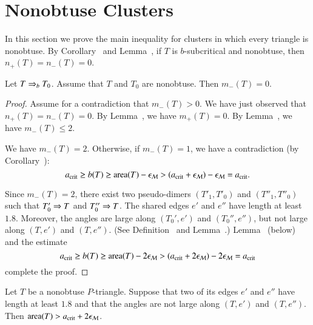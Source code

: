 \section{Nonobtuse Clusters}

In this section we prove the main inequality for clusters in which
every triangle is nonobtuse.  By Corollary~ and
Lemma~, if $T$ is $b$-subcritical and nonobtuse, then
$n_+(T)=n_-(T)=0$.

\begin{lemma} 
  Let $T\Rightarrow_{b} T_0$. Assume that $T$ and $T_0$ are nonobtuse.  Then
  $m_-(T)=0$.
\end{lemma}

\begin{proof}  
  Assume for a contradiction that $m_-(T)>0$.  We have just observed
  that $n_+(T)=n_-(T)=0$.  By Lemma~, we have
  $m_+(T)=0$.  By Lemma~, we have $m_-(T)\le 2$.


  We have $m_-(T)=2$.  Otherwise, if $m_-(T)=1$, we have a
  contradiction (by Corollary~):
\[
a_\text{crit} \ge b(T) \ge {\operatorname{area}}(T) - \epsilon_{\mathcal M} 
> (a_\text{crit} + \epsilon_{\mathcal M}) - \epsilon_{\mathcal M} = a_\text{crit}.
\]

Since $m_-(T)=2$, there exist two pseudo-dimers $(T'_1,T'_0)$ and
$(T''_1,T''_0)$ such that $T'_0\Rightarrow T$ and $T''_0\Rightarrow T$.  The shared
edges $e'$ and $e''$ have length at least $1.8$.  Moreover, the angles
are large along $(T_0',e')$ and $(T_0'',e'')$, but not large along
$(T,e')$ and $(T,e'')$.  (See Definition~ and
Lemma~.)  Lemma~ (below) and the
estimate
\[
a_\text{crit} \ge b(T) \ge {\operatorname{area}}(T) - 2\epsilon_{\mathcal M} 
> (a_\text{crit} + 2\epsilon_{\mathcal M}) - 2\epsilon_{\mathcal M} = a_\text{crit}
\]
complete the proof.
\end{proof}

\begin{lemma} 
  Let $T$ be a nonobtuse $P$-triangle.  Suppose that two of its edges
  $e'$ and $e''$ have length at least $1.8$ and that the angles are
  not large along $(T,e')$ and $(T,e'')$.  Then ${\operatorname{area}}(T) > a_\text{crit} +
  2\epsilon_{\mathcal M}$.
\end{lemma}

